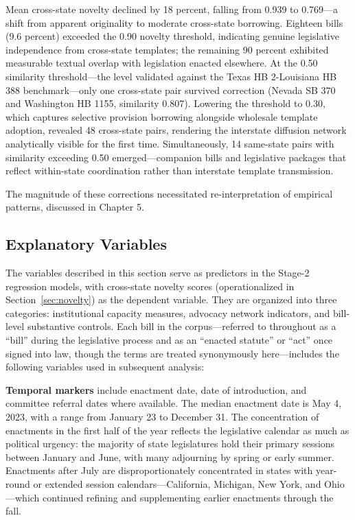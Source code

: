 Mean cross-state novelty declined by 18 percent, falling from 0.939 to 0.769---a shift from apparent originality to moderate cross-state borrowing. Eighteen bills (9.6 percent) exceeded the 0.90 novelty threshold, indicating genuine legislative independence from cross-state templates; the remaining 90 percent exhibited measurable textual overlap with legislation enacted elsewhere. At the 0.50 similarity threshold---the level validated against the Texas HB 2-Louisiana HB 388 benchmark---only one cross-state pair survived correction (Nevada SB 370 and Washington HB 1155, similarity 0.807). Lowering the threshold to 0.30, which captures selective provision borrowing alongside wholesale template adoption, revealed 48 cross-state pairs, rendering the interstate diffusion network analytically visible for the first time. Simultaneously, 14 same-state pairs with similarity exceeding 0.50 emerged---companion bills and legislative packages that reflect within-state coordination rather than interstate template transmission.

The magnitude of these corrections necessitated re-interpretation of empirical patterns, discussed in Chapter 5.

\subsection{Explanatory Variables}
The variables described in this section serve as predictors in the Stage-2 regression models, with cross-state novelty scores (operationalized in Section~\ref{sec:novelty}) as the dependent variable. They are organized into three categories: institutional capacity measures, advocacy network indicators, and bill-level substantive controls. Each bill in the corpus---referred to throughout as a ``bill'' during the legislative process and as an ``enacted statute'' or ``act'' once signed into law, though the terms are treated synonymously here---includes the following variables used in subsequent analysis:


\textbf{Temporal markers} include enactment date, date of introduction, and committee referral dates where available. The median enactment date is May 4, 2023, with a range from January 23 to December 31. The concentration of enactments in the first half of the year reflects the legislative calendar as much as political urgency: the majority of state legislatures hold their primary sessions between January and June, with many adjourning by spring or early summer. Enactments after July are disproportionately concentrated in states with year-round or extended session calendars---California, Michigan, New York, and Ohio---which continued refining and supplementing earlier enactments through the fall.

